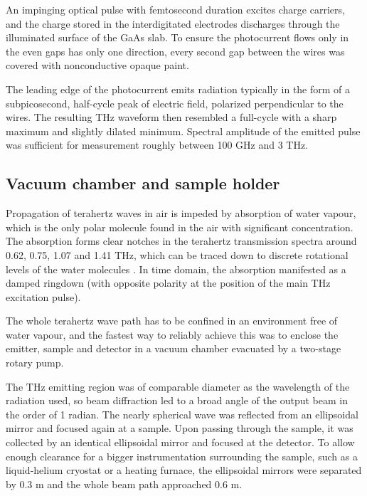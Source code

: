 An impinging optical pulse with femtosecond duration excites charge carriers, and the charge stored in the interdigitated electrodes discharges through the illuminated surface %
of the GaAs slab. To ensure the photocurrent flows only in the even gaps has only one direction, every second gap between the wires was covered with nonconductive opaque paint.

	The leading edge of the photocurrent emits radiation typically in the form of a subpicosecond, half-cycle peak of electric field, polarized perpendicular to the wires. 
	The resulting THz waveform then resembled a full-cycle with a sharp maximum and slightly dilated minimum. Spectral amplitude of the emitted pulse was sufficient for measurement roughly between 100 GHz and 3 THz.


\subsection{Vacuum chamber and sample holder}%
Propagation of terahertz waves in air is impeded by absorption of water vapour, which is the only polar molecule found in the air with significant concentration. The absorption forms clear notches in the terahertz transmission spectra around 0.62, 0.75, 1.07 and 1.41 THz, which can be traced down to discrete rotational levels of the water molecules \cite{exter1989}. In time domain, the absorption manifested as a damped ringdown (with opposite polarity at the position of the main THz excitation pulse). 

The whole terahertz wave path has to be confined in an environment free of water vapour, and the fastest way to reliably achieve this was to enclose the emitter, sample and detector in a vacuum chamber evacuated by a two-stage rotary pump. 

The THz emitting region was of comparable diameter as the wavelength of the radiation used, so beam diffraction led to a broad angle of the output beam in the order of 1 radian. The nearly spherical wave was reflected from an ellipsoidal %
 mirror and focused again at a sample. Upon passing through the sample, it was collected by an identical ellipsoidal mirror and focused at the detector. 
To allow enough clearance for a bigger instrumentation surrounding the sample, such as a liquid-helium cryostat or a heating furnace, the ellipsoidal mirrors were separated by 0.3 m and the whole beam path approached 0.6 m. %


